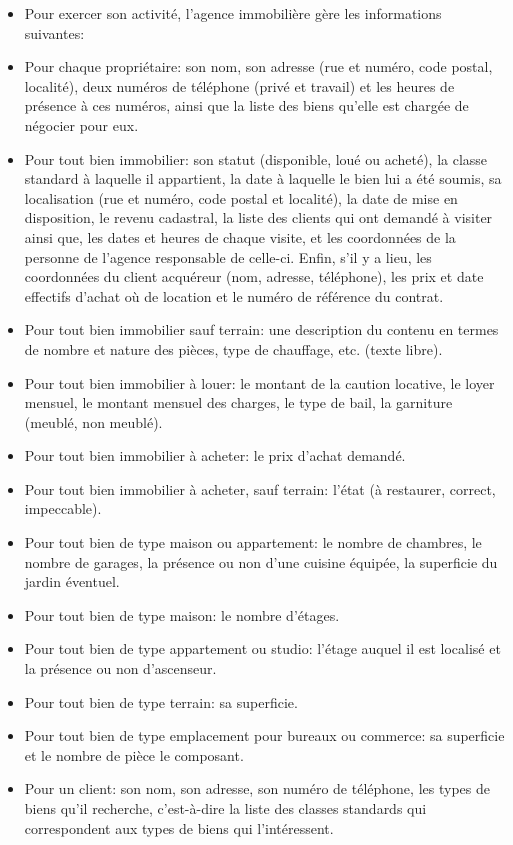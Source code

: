 \begin{itemize}
  \item Pour exercer son activité, l'agence immobilière gère les informations suivantes:
  \item Pour chaque propriétaire: son nom, son adresse (rue et numéro, code postal, localité), deux numéros de téléphone (privé et travail) et les heures de présence à ces numéros, ainsi que la liste des biens qu'elle est chargée de négocier pour eux.
  \item Pour tout bien immobilier: son statut (disponible, loué ou acheté), la classe standard à laquelle il appartient, la date à laquelle le bien lui a été soumis, sa localisation (rue et numéro, code postal et localité), la date de mise en disposition, le revenu cadastral, la liste des clients qui ont demandé à visiter ainsi que, les dates et heures de chaque visite, et les coordonnées de la personne de l'agence responsable de celle-ci. Enfin, s'il y a lieu, les coordonnées du client acquéreur (nom, adresse, téléphone), les prix et date effectifs d'achat où de location et le numéro de référence du contrat.
  \item Pour tout bien immobilier sauf terrain: une description du contenu en termes de nombre et nature des pièces, type de chauffage, etc. (texte libre).
  \item Pour tout bien immobilier à louer: le montant de la caution locative, le loyer mensuel, le montant mensuel des charges, le type de bail, la \og{}garniture\fg{} (meublé, non meublé).
  \item Pour tout bien immobilier à acheter: le prix d'achat demandé.
  \item Pour tout bien immobilier à acheter, sauf terrain: l'état (à restaurer, correct, impeccable).
  \item Pour tout bien de type \og{}maison\fg{} ou \og{}appartement\fg{}: le nombre de chambres, le nombre de garages, la présence ou non d'une cuisine équipée, la superficie du jardin éventuel.
  \item Pour tout bien de type \og{}maison\fg{}: le nombre d'étages.
  \item Pour tout bien de type \og{}appartement\fg{} ou \og{}studio\fg{}: l'étage auquel il est localisé et la présence ou non d'ascenseur.
  \item Pour tout bien de type \og{}terrain\fg{}: sa superficie.
  \item Pour tout bien de type \og{}emplacement pour bureaux ou commerce\fg{}: sa superficie et le nombre de pièce le composant.
  \item Pour un client: son nom, son adresse, son numéro de téléphone, les types de biens qu'il recherche, c'est-à-dire la liste des classes standards qui correspondent aux types de biens qui l'intéressent.
\end{itemize}

